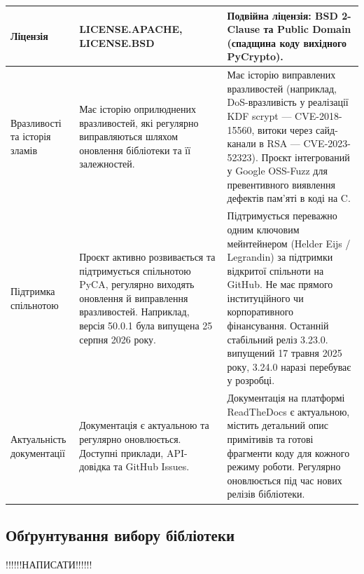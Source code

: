 \begin{longtable}{|p{2cm}|p{6cm}|p{6cm}|}
Ліцензія &
LICENSE.APACHE, \-LICENSE.BSD&
Подвійна ліцензія: BSD 2-Clause та Public Domain (спадщина коду вихідного PyCrypto). \\
\hline

Вразли\-вості та історія зламів &
Має історію оприлюднених вразливостей, 
які регулярно виправляються шляхом оновлення бібліотеки та її залежностей.&
Має історію виправлених вразливостей (наприклад, DoS-вразливість у реалізації KDF scrypt --- CVE-2018-15560, витоки через сайд-канали в RSA --- CVE-2023-52323). Проєкт інтегрований у Google OSS-Fuzz для превентивного виявлення дефектів пам'яті в коді на C. \\
\hline

Підтримка спільнотою &
Проєкт активно розвивається та підтримується спільнотою PyCA,
регулярно виходять оновлення й виправлення вразливостей.
Наприклад, версія 50.0.1 була випущена 25 серпня 2026 року.&
Підтримується переважно одним ключовим мейнтейнером (Helder Eijs / Legrandin) за підтримки відкритої спільноти на GitHub. Не має прямого інституційного чи корпоративного фінансування. Останній стабільний реліз 3.23.0. випущений 17 травня 2025 року, 3.24.0 наразі перебуває у розробці. \\
\hline

Актуаль\-ність документації &
Документація є актуальною та регулярно оновлюється. Доступні приклади, API-довідка та GitHub Issues. &
Документація на платформі ReadTheDocs є актуальною, містить детальний опис примітивів та готові фрагменти коду для кожного режиму роботи. Регулярно оновлюється під час нових релізів бібліотеки. \\
\hline

\end{longtable}

\subsection{Обґрунтування вибору бібліотеки}
!!!!!!НАПИСАТИ!!!!!!
